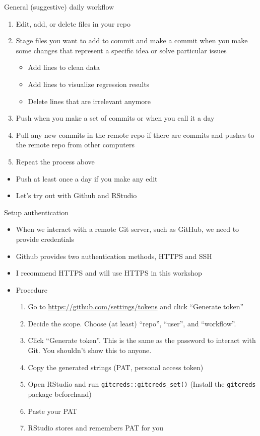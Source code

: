 \documentclass[handout,pdftex,10pt,aspectratio=169]{beamer}
\begin{document}
\begin{frame}{General (suggestive) daily workflow}
    \begin{enumerate}[<+->]
    \item Edit, add, or delete files in your repo
    \item Stage files you want to add to commit and 
    make a commit when you make some changes that represent a specific idea or solve particular issues
    \begin{itemize}
      \item Add lines to clean data
      \item Add lines to visualize regression results
      \item Delete lines that are irrelevant anymore
    \end{itemize}
    \item Push when you make a set of commits or when you call it a day
    \item Pull any new commits in the remote repo if there are commits and pushes to the remote repo
    from other computers
    \item Repeat the process above
  \end{enumerate}
  \medskip
  \begin{itemize}[<+->]
    \item Push at least once a day if you make any edit
    \item Let's try out with Github and RStudio
  \end{itemize}
\end{frame}


\begin{frame}{Setup authentication}
  \begin{itemize}[<+->]
    \item When we interact with a remote Git server, 
    such as GitHub, we need to provide credentials
    \item Github provides two authentication methods, HTTPS and SSH
    \item I recommend HTTPS and will use HTTPS in this workshop
    \item Procedure
    \begin{enumerate}
      \item Go to  \url{https://github.com/settings/tokens} and click ``Generate token''
      \item Decide the scope. Choose (at least) ``repo'', ``user'', and ``workflow''.
      \item Click ``Generate token''. This is the same as the password to interact  with Git. You shouldn't show this to anyone.
      \item Copy the generated strings (PAT, personal access token)
      \item Open RStudio and run \texttt{gitcreds::gitcreds\_set()} 
      (Install the \texttt{gitcreds} package beforehand)
      \item Paste your PAT
      \item RStudio stores and remembers PAT for you
    \end{enumerate}
  \end{itemize}
\end{frame}
\end{document}
